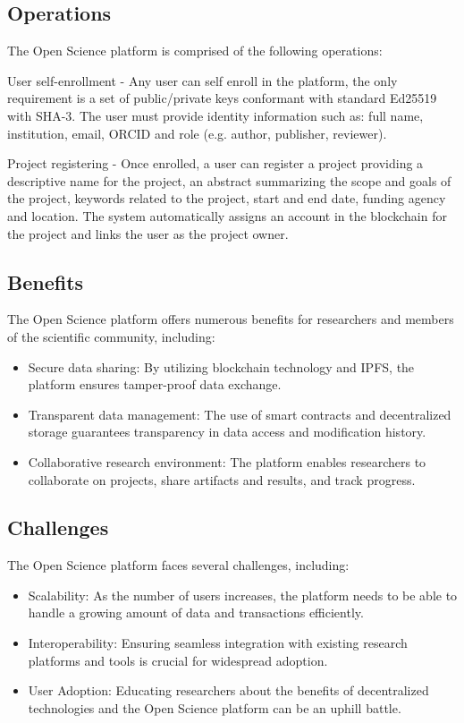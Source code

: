 \documentclass{article}
\begin{document}
\subsection{Operations}

The Open Science platform is comprised of the following operations:

User self-enrollment - Any user can self enroll in the platform, the only requirement is a set of public/private keys conformant with standard Ed25519 with SHA-3. The user must provide identity information such as: full name, institution, email, ORCID and role (e.g. author, publisher, reviewer).

Project registering - Once enrolled, a user can register a project providing a descriptive name for the project, an abstract summarizing the scope and goals of the project, keywords related to the project, start and end date, funding agency and location. The system automatically assigns an account in the blockchain for the project and links the user as the project owner.





\subsection{Benefits}

The Open Science platform offers numerous benefits for researchers and members of the scientific community, including:

\begin{itemize}
    \item Secure data sharing: By utilizing blockchain technology and IPFS, the platform ensures tamper-proof data exchange.
    \item Transparent data management: The use of smart contracts and decentralized storage guarantees transparency in data access and modification history.
    \item Collaborative research environment: The platform enables researchers to collaborate on projects, share artifacts and results, and track progress.
\end{itemize}

\subsection{Challenges}

The Open Science platform faces several challenges, including:

\begin{itemize}
    \item Scalability: As the number of users increases, the platform needs to be able to handle a growing amount of data and transactions efficiently.
    \item Interoperability: Ensuring seamless integration with existing research platforms and tools is crucial for widespread adoption.
    \item User Adoption: Educating researchers about the benefits of decentralized technologies and the Open Science platform can be an uphill battle.
\end{itemize}
\end{document}
